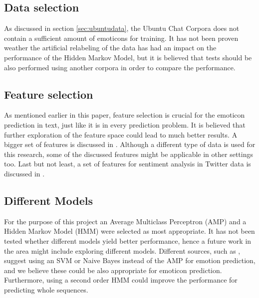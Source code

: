 


\subsection{Data selection}
As discussed in section \ref{sec:ubuntudata}, the Ubuntu Chat Corpora does not contain a sufficient amount of emoticons for training. It has not been proven weather the artificial relabeling of the data has had an impact on the performance of the Hidden Markov Model, but it is believed that tests should be also performed using another corpora in order to compare the performance. 


\subsection{Feature selection}

As mentioned earlier in this paper, feature selection is crucial for the emoticon prediction in text, just like it is in every prediction problem. It is believed that further exploration of the feature space could lead to much better results. A bigger set of features is discussed in \cite{fairytales}. Although a different type of data is used for this research, some of the discussed features might be applicable in other settings too. Last but not least, a set of features for sentiment analysis in Twitter data is discussed in \cite{twittersentiment}.


\subsection{Different Models}

For the purpose of this project an Average Multiclass Perceptron (AMP) and a Hidden Markov Model (HMM) were selected as most appropriate. It has not been tested whether different models yield better performance, hence a future work in the area might include exploring different models. Different sources, such as \cite{emotionclassifiers}, suggest using an SVM or Naive Bayes instead of the AMP for emotion prediction, and we believe these could be also appropriate for emoticon prediction. Furthermore, using a second order HMM could improve the performance for predicting whole sequences.
\\ \\
